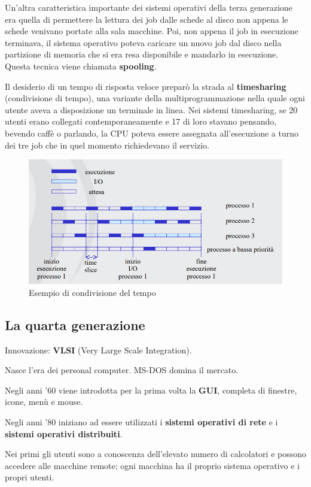 Un'altra caratteristica importante dei sistemi operativi della terza generazione era quella di permettere la lettura dei job dalle schede al disco non appena le schede venivano portate alla sala macchine. Poi, non appena il job in esecuzione terminava, il sistema operativo poteva caricare un nuovo job dal disco nella partizione di memoria che si era resa disponibile e mandarlo in esecuzione. Questa tecnica viene chiamata \textbf{spooling}.

Il desiderio di un tempo di risposta veloce preparò la strada al \textbf{timesharing} (condivisione di tempo), una variante della multiprogrammazione nella quale ogni utente aveva a disposizione un terminale in linea. Nei sistemi timesharing, se 20 utenti erano collegati contemporaneamente e 17 di loro stavano pensando, bevendo caffè o parlando, la CPU poteva essere assegnata all'esecuzione a turno dei tre job che in quel momento richiedevano il servizio.

\begin{figure}[h!]
    \centering
    \includegraphics[width=0.7\linewidth]{assets/timesharing1.png}
    \caption{Esempio di condivisione del tempo}
\end{figure}

\subsection{La quarta generazione}

Innovazione: \textbf{VLSI} (Very Large Scale Integration).

Nasce l'era dei personal computer. MS-DOS domina il mercato.

Negli anni '60 viene introdotta per la prima volta la \textbf{GUI}, completa di finestre, icone, menù e mouse.

Negli anni '80 iniziano ad essere utilizzati i \textbf{sistemi operativi di rete} e i \textbf{sistemi operativi distribuiti}.

Nei primi gli utenti sono a conoscenza dell'elevato numero di calcolatori e possono accedere alle macchine remote; ogni macchina ha il proprio sistema operativo e i propri utenti.

